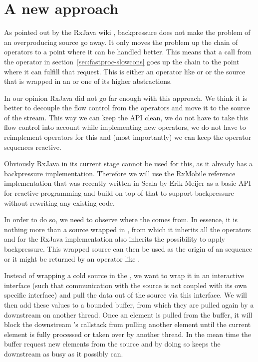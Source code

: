 \section{A new approach}

As pointed out by the RxJava wiki \cite{RxJava-Wiki-Backpressure}, backpressure does not make the problem of an overproducing source go away. It only moves the problem up the chain of operators to a point where it can be handled better. This means that a  call from the  operator in section~\ref{sec:fastproc-slowcons} goes up the chain to the point where it can fulfill that request. This is either an operator like  or  or the source that is wrapped in an  or one of its higher abstractions.

In our opinion RxJava did not go far enough with this approach. We think it is better to decouple the flow control from the operators and move it to the source of the stream. This way we can keep the API clean, we do not have to take this flow control into account while implementing new operators, we do not have to reimplement operators for this and (most importantly) we can keep the operator sequences reactive.

Obviously RxJava in its current stage cannot be used for this, as it already has a backpressure implementation. Therefore we will use the RxMobile \cite{RxMobile} reference implementation that was recently written in Scala by Erik Meijer as a basic API for reactive programming and build on top of that to support backpressure without rewriting any existing code.

In order to do so, we need to observe where the \obs comes from. In essence, it is nothing more than a source wrapped in , from which it inherits all the operators and for the RxJava implementation also inherits the possibility to apply backpressure. This wrapped source can then be used as the origin of an \obs sequence or it might be returned by an operator like .

Instead of wrapping a cold source in the , we want to wrap it in an interactive interface (such that communication with the source is not coupled with its own specific interface) and pull the data out of the source via this interface. We will then add these values to a bounded buffer, from which they are pulled again by a downstream \obs on another thread. Once an element is pulled from the buffer, it will block the downstream \obs's callstack from pulling another element until the current element is fully processed or taken over by another thread. In the mean time the buffer request new elements from the source and by doing so keeps the downstream \obs as busy as it possibly can.

